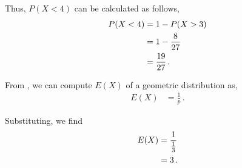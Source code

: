 \begin{subquestions}
\begin{subsubquestions}
\begin{subsubsubquestions}
Thus, $P(X<4)$ can be calculated as follows,
\begin{align}
	P(X < 4) & = 1 - P(X > 3) \nonumber \\
	         & = 1 - \frac{8}{27} \nonumber \\
	         & = \frac{19}{27} \,.
\end{align}

\end{subsubsubquestions}


\subsubquestion

From , we can compute $E(X)$ of a geometric distribution as, 
\begin{align}
	E(X) & = \frac{1}{p} \,.
\end{align}

Substituting, we find
\begin{align}
	E(X) & = \frac{1}{\frac{1}{3}} \nonumber \\
	     & = 3 \,.
\end{align}


\end{subsubquestions}

\end{subquestions}
